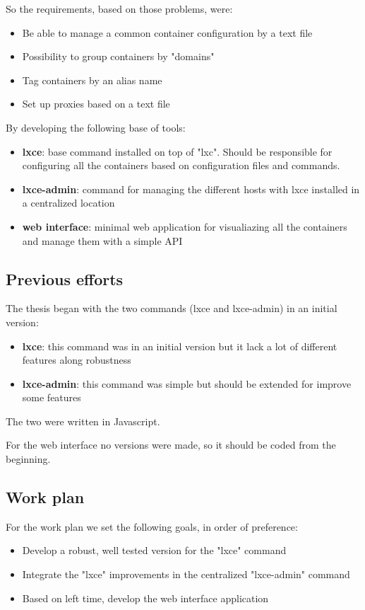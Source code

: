 So the requirements, based on those problems, were:
\begin{itemize}
	\item {Be able to manage a common container configuration by a text file}
	\item {Possibility to group containers by "domains"}
	\item {Tag containers by an alias name}
	\item {Set up proxies based on a text file}
\end{itemize}

By developing the following base of tools:
\begin{itemize}
	\item {\textbf{lxce}: base command installed on top of "lxc". Should be responsible for configuring all the containers based on configuration files and commands.}
	\item {\textbf{lxce-admin}: command for managing the different hosts with lxce installed in a centralized location}
	\item {\textbf{web interface}: minimal web application for visualiazing all the containers and manage them with a simple API}
\end{itemize}


\subsection{Previous efforts}
\label{ssec:previous}
The thesis began with the two commands (lxce and lxce-admin) in an initial version:
\begin{itemize}
	\item {\textbf{lxce}: this command was in an initial version but it lack a lot of different features along robustness}
	\item {\textbf{lxce-admin}: this command was simple but should be extended for improve some features}
\end{itemize}
The two were written in Javascript.

For the web interface no versions were made, so it should be coded from the beginning.

\subsection{Work plan}
\label{ssec:gantt}
For the work plan we set the following goals, in order of preference:
\begin{itemize}
	\item {Develop a robust, well tested version for the "lxce" command}
	\item {Integrate the "lxce" improvements in the centralized "lxce-admin" command}
	\item {Based on left time, develop the web interface application}
\end{itemize}

